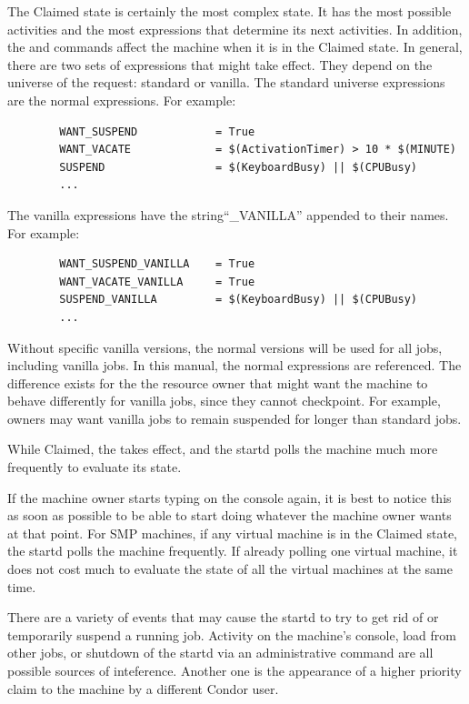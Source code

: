 The Claimed state is certainly the most complex state.
It has the most possible activities and the most expressions that
determine its next activities.
In addition, the  and  commands affect
the machine when it is in the Claimed state.
In general, there are two sets of expressions that might take effect.
They depend on the universe of the request: standard or vanilla.
The standard universe expressions are the normal expressions.
For example:
\begin{verbatim}
        WANT_SUSPEND            = True
        WANT_VACATE             = $(ActivationTimer) > 10 * $(MINUTE)
        SUSPEND                 = $(KeyboardBusy) || $(CPUBusy)
        ...
\end{verbatim}

The vanilla expressions have the string``\_VANILLA'' appended to their names.
For example:
\begin{verbatim}
        WANT_SUSPEND_VANILLA    = True
        WANT_VACATE_VANILLA     = True
        SUSPEND_VANILLA         = $(KeyboardBusy) || $(CPUBusy)
        ...
\end{verbatim}

Without specific vanilla versions, the normal versions
will be used for all jobs, including vanilla jobs.  
In this manual, the normal expressions are referenced.
The difference exists for the
the resource owner that might want the machine
to behave differently for vanilla jobs, since they cannot checkpoint.
For example, owners may want vanilla jobs to remain suspended for
longer than standard jobs.

While Claimed, the  takes effect, and the
startd polls the machine much more frequently to evaluate its
state.

If the machine owner starts typing on the console again,
it is best to notice this as
soon as possible to be able to start doing whatever 
the machine owner wants at that point.
For SMP machines, if any virtual machine is in the Claimed state, the
startd polls the machine frequently.
If already polling one virtual machine, it does not
cost much to evaluate the state of all the virtual machines at
the same time.

There are a variety of events that may cause the startd to try to get
rid of or temporarily suspend a running job.  Activity on the
machine's console, load from other jobs, or shutdown of the startd via
an administrative command are all possible sources of inteference.
Another one is the appearance of a higher priority claim to the
machine by a different Condor user.

